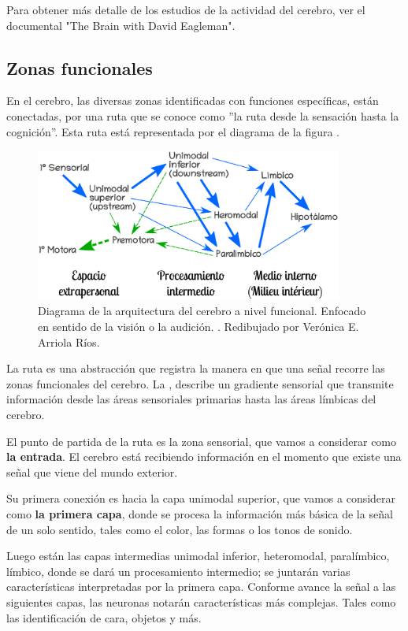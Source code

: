 Para obtener más detalle de los estudios de la actividad del cerebro, ver el documental "The Brain with David Eagleman".

\subsection{Zonas funcionales}

En el cerebro, las diversas zonas identificadas con funciones específicas, están conectadas, por una ruta que se conoce como 
 ''la ruta desde la sensación hasta la cognición''. Esta ruta está representada por el diagrama de la figura . \parencite{sensAcogn}
 
 \begin{figure}[h]
  \centering
  \includegraphics[width=0.9\textwidth]{../Figuras/zonasFuncionales.png}
  \caption{Diagrama de la arquitectura del cerebro a nivel funcional. Enfocado en sentido de la visión o la audición. \parencite{Mesulam1998}. Redibujado por Verónica E. Arriola Ríos. }
  \label{fig:zonasFun}
 \end{figure}

La ruta es una abstracción que registra la manera en que una señal recorre las zonas funcionales del cerebro.
La , describe un gradiente sensorial que transmite información desde las áreas sensoriales primarias hasta las áreas límbicas del cerebro.

El punto de partida de la ruta es la zona sensorial, que vamos a considerar como \textbf{la entrada}. El cerebro está recibiendo información en el momento que existe una señal que viene del mundo exterior.

Su primera conexión es hacia la capa unimodal superior, que vamos a considerar como \textbf{la primera capa}, donde se procesa la información más básica de la señal de un solo  sentido, tales como el color, las formas o los tonos de sonido.

Luego están las capas intermedias unimodal inferior, heteromodal, paralímbico, límbico, donde se dará un procesamiento intermedio; se juntarán varias características interpretadas por la primera capa. Conforme avance la señal a las siguientes capas, las neuronas notarán características más complejas. Tales como las identificación de cara, objetos y más.

